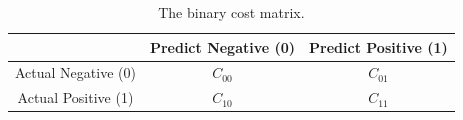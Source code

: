 \begin{table}[H]
    \centering
    \begin{tabular}{c|cc}
         & Predict Negative (0) & Predict Positive (1) \\
         \hline
         Actual Negative (0) & $C_{00}$ & $C_{01}$ \\
         Actual Positive (1) & $C_{10}$ & $C_{11}$
    \end{tabular}
    \caption{The binary cost matrix.}\label{tab:binary_cost_matrix}
\end{table}